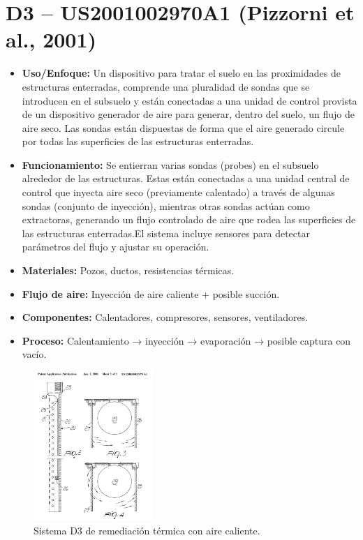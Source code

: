 \documentclass[12pt]{article}
\begin{document}
\section*{ D3 – US2001002970A1 (Pizzorni et al., 2001)}

\begin{itemize}
    \item \textbf{Uso/Enfoque:} Un dispositivo para tratar el suelo en las proximidades de estructuras enterradas, comprende una pluralidad de sondas que se introducen en el subsuelo y están conectadas a una unidad de control provista de un dispositivo generador de aire para generar, dentro del suelo, un flujo de aire seco. Las sondas están dispuestas de forma que el aire generado circule por todas las superficies de las estructuras enterradas.

    \item \textbf{Funcionamiento:} Se entierran varias sondas (probes) en el subsuelo alrededor de las estructuras. Estas están conectadas a una unidad central de control que inyecta aire seco (previamente calentado) a través de algunas sondas (conjunto de inyección), mientras otras sondas actúan como extractoras, generando un flujo controlado de aire que rodea las superficies de las estructuras enterradas.El sistema incluye sensores para detectar parámetros del flujo y ajustar su operación.

    \item \textbf{Materiales:} Pozos, ductos, resistencias térmicas.
    \item \textbf{Flujo de aire:} Inyección de aire caliente + posible succión.
    \item \textbf{Componentes:} Calentadores, compresores, sensores, ventiladores.
    \item \textbf{Proceso:} Calentamiento → inyección → evaporación → posible captura con vacío.
\end{itemize}

\begin{figure}[H]
\centering
\includegraphics[width=0.4\textwidth]{images/d3_pizzorni.png}
\caption{Sistema D3 de remediación térmica con aire caliente.}
\end{figure}
\end{document}
